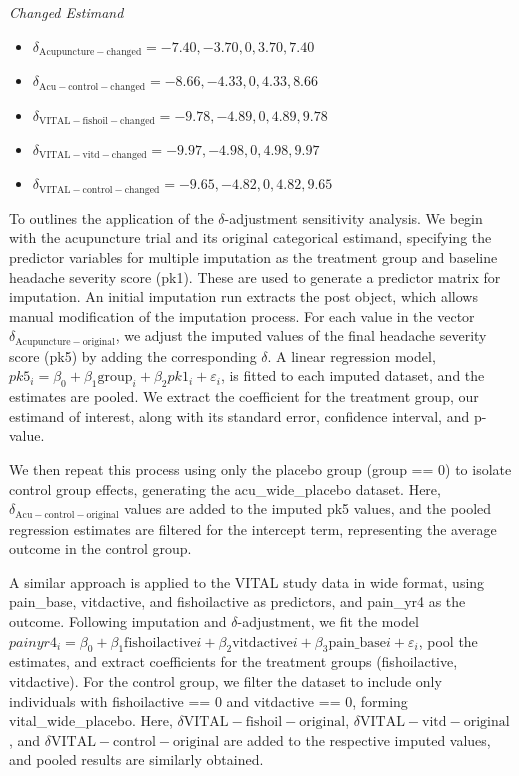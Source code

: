 \documentclass{article}
\providecommand{\tightlist}{%
  \setlength{\itemsep}{0pt}\setlength{\parskip}{0pt}}
\begin{document}
\emph{Changed Estimand}

\begin{itemize}
\tightlist
\item
  \(\delta_\mathrm{Acupuncture-changed} = -7.40, -3.70, 0, 3.70, 7.40\)\\
\item
  \(\delta_\mathrm{Acu-control-changed} = -8.66, -4.33, 0, 4.33, 8.66\)\\
\item
  \(\delta_\mathrm{VITAL-fishoil-changed} = -9.78, -4.89, 0, 4.89, 9.78\)\\
\item
  \(\delta_\mathrm{VITAL-vitd-changed} = -9.97, -4.98, 0, 4.98, 9.97\)\\
\item
  \(\delta_\mathrm{VITAL-control-changed} = -9.65, -4.82, 0, 4.82, 9.65\)
\end{itemize}

To outlines the application of the \(\delta\)-adjustment sensitivity
analysis. We begin with the acupuncture trial and its original
categorical estimand, specifying the predictor variables for multiple
imputation as the treatment group and baseline headache severity score
(pk1). These are used to generate a predictor matrix for imputation. An
initial imputation run extracts the post object, which allows manual
modification of the imputation process. For each value in the vector
\(\delta_\mathrm{Acupuncture-original}\), we adjust the imputed values
of the final headache severity score (pk5) by adding the corresponding
\(\delta\). A linear regression model,
\(pk5_i = \beta_0 + \beta_1 \text{group}_i + \beta_2 pk1_i + \varepsilon_i\),
is fitted to each imputed dataset, and the estimates are pooled. We
extract the coefficient for the treatment group, our estimand of
interest, along with its standard error, confidence interval, and
p-value.

We then repeat this process using only the placebo group (group == 0) to
isolate control group effects, generating the acu\_wide\_placebo
dataset. Here, \(\delta_\mathrm{Acu-control-original}\) values are added
to the imputed pk5 values, and the pooled regression estimates are
filtered for the intercept term, representing the average outcome in the
control group.

A similar approach is applied to the VITAL study data in wide format,
using pain\_base, vitdactive, and fishoilactive as predictors, and
pain\_yr4 as the outcome. Following imputation and
\(\delta\)-adjustment, we fit the model
\(painyr4_i = \beta_0 + \beta_1 \text{fishoilactive}i + \beta_2 \text{vitdactive}i + \beta_3 \text{pain\_base}i + \varepsilon_i\),
pool the estimates, and extract coefficients for the treatment groups
(fishoilactive, vitdactive). For the control group, we filter the
dataset to include only individuals with fishoilactive == 0 and
vitdactive == 0, forming vital\_wide\_placebo. Here,
\(\delta\mathrm{VITAL-fishoil-original}\),
\(\delta\mathrm{VITAL-vitd-original}\), and
\(\delta\mathrm{VITAL-control-original}\) are added to the respective
imputed values, and pooled results are similarly obtained.
\end{document}

